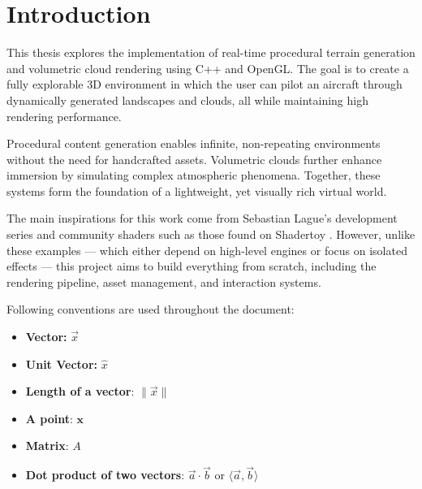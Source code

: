 \chapter{Introduction}
\label{ch:intro}




This thesis explores the implementation of real-time procedural terrain generation and volumetric cloud rendering using C++ and OpenGL. The goal is to create a fully explorable 3D environment in which the user can pilot an aircraft through dynamically generated landscapes and clouds, all while maintaining high rendering performance.

Procedural content generation enables infinite, non-repeating environments without the need for handcrafted assets. Volumetric clouds further enhance immersion by simulating complex atmospheric phenomena. Together, these systems form the foundation of a lightweight, yet visually rich virtual world.

The main inspirations for this work come from Sebastian Lague's development series \cite{sebestianlague2019} and community shaders such as those found on Shadertoy \cite{shadertoy2013}. However, unlike these examples — which either depend on high-level engines or focus on isolated effects — this project aims to build everything from scratch, including the rendering pipeline, asset management, and interaction systems.

Following conventions are used throughout the document:

\begin{itemize}[noitemsep, topsep=0pt]
    \item \textbf{Vector:} $\vec{x}$
    \item \textbf{Unit Vector:} $\hat{x}$
    \item \textbf{Length of a vector}: $\|\vec{x}\|$
    \item \textbf{A point}: $\textbf{x}$
    \item \textbf{Matrix}: $A$
    \item \textbf{Dot product of two vectors}: 
    $ \vec{a} \cdot \vec{b} $ or 
    $ \langle \vec{a}, \vec{b} \rangle $
\end{itemize}